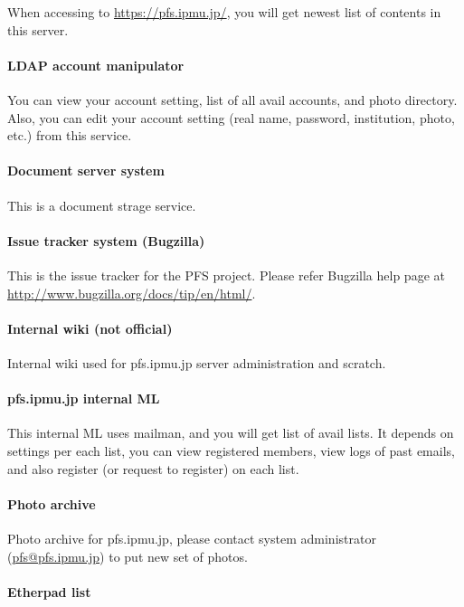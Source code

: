 \documentclass[a4paper,notitlepage]{article}
\begin{document}
When accessing to \url{https://pfs.ipmu.jp/}, you will get newest list of 
contents in this server. 

\paragraph{LDAP account manipulator}

You can view your account setting, list of all avail accounts, and photo 
directory. 
Also, you can edit your account setting (real name, password, institution, 
photo, etc.) from this service.

\paragraph{Document server system}

This is a document strage service.

\paragraph{Issue tracker system (Bugzilla)}

This is the issue tracker for the PFS project. 
Please refer Bugzilla help page at 
\url{http://www.bugzilla.org/docs/tip/en/html/}.

\paragraph{Internal wiki (not official)}

Internal wiki used for pfs.ipmu.jp server administration and scratch. 

\paragraph{pfs.ipmu.jp internal ML}

This internal ML uses mailman, and you will get list of avail lists. 
It depends on settings per each list, you can view registered members, 
view logs of past emails, and also register (or request to register) on 
each list. 

\paragraph{Photo archive}

Photo archive for pfs.ipmu.jp, 
please contact system administrator (\url{pfs@pfs.ipmu.jp}) to put new 
set of photos. 

\paragraph{Etherpad list}
\end{document}
